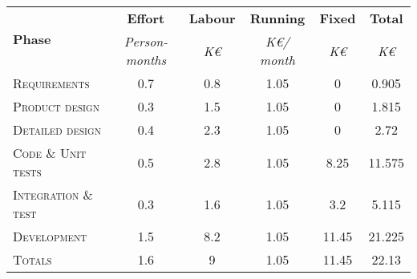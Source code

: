 \begin{tabular}{l|c|cccc}
\multirow{2}{*}{\textbf{Phase}} & \textbf{Effort} & \textbf{Labour} & \textbf{Running} & \textbf{Fixed} & \textbf{Total} \\
& \textit{Person-months} & \textit{K\euro} & \textit{K\euro / month} & \textit{K\euro} & \textit{K\euro} \\
\textsc{Requirements} & 0.7 & 0.8 & 1.05 & 0 & 0.905  \\
\textsc{Product design} & 0.3 & 1.5 & 1.05 & 0 & 1.815  \\
\textsc{Detailed design} & 0.4 & 2.3 & 1.05 & 0 & 2.72  \\
\textsc{Code \& Unit tests} & 0.5 & 2.8 & 1.05 & 8.25 & 11.575  \\
\textsc{Integration \& test} & 0.3 & 1.6 & 1.05 & 3.2 & 5.115  \\ \hline
\textsc{Development} & 1.5 & 8.2 & 1.05 & 11.45 & 21.225  \\
\textsc{Totals} & 1.6 & 9 & 1.05 & 11.45 & 22.13
\end{tabular}
